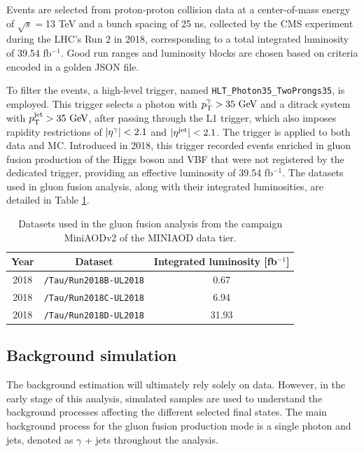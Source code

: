 Events are selected from proton-proton collision data at a center-of-mass energy of $\sqrt{s}=$13 TeV and a bunch spacing of 25 ns, collected by the CMS experiment during the LHC's Run 2 in 2018, corresponding to a total integrated luminosity of 39.54 fb$^{-1}$. Good run ranges and luminosity blocks are chosen based on criteria encoded in a golden JSON file.

To filter the events, a high-level trigger, named \verb+HLT_Photon35_TwoProngs35+, is employed. This trigger selects a photon with $\pT^{\gamma} > 35\ \GeV$ and a ditrack system with $p_\text{T}^{\text{jet}} > 35\ \text{GeV}$, after passing through the L1 trigger, which also imposes rapidity restrictions of $\left\lvert\eta^{\gamma}\right\rvert<2.1$ and $\left\lvert\eta^{\text{jet}}\right\rvert<2.1$. The trigger is applied to both data and MC. Introduced in 2018, this trigger recorded events enriched in gluon fusion production of the Higgs boson and VBF that were not registered by the dedicated trigger, providing an effective luminosity of 39.54 fb$^{-1}$. The datasets used in gluon fusion analysis, along with their integrated luminosities, are detailed in Table \ref{tab:ggH_datasets}.

\begin{table}[ht]
    \centering
    \begin{tabular}{|c|c|c|}
        \hline
        \multicolumn{1}{|c|}{\cellcolor{lightgray}Year} & \cellcolor{lightgray}Dataset & \cellcolor{lightgray}Integrated luminosity [fb$^{-1}$] \\ \hline
        2018    & \verb+/Tau/Run2018B-UL2018+  & 0.67 \\
        2018    & \verb+/Tau/Run2018C-UL2018+  & 6.94 \\
        2018    & \verb+/Tau/Run2018D-UL2018+  & 31.93 \\ \hline
    \end{tabular}
    \caption{Datasets used in the gluon fusion analysis from the campaign MiniAODv2 of the MINIAOD data tier.}
    \label{tab:ggH_datasets}
\end{table}

\subsection{Background simulation}

The background estimation will ultimately rely solely on data. However, in the early stage of this analysis, simulated samples are used to understand the background processes affecting the different selected final states. The main background process for the gluon fusion production mode is a single photon and jets, denoted as $\gamma$ + jets throughout the analysis.


